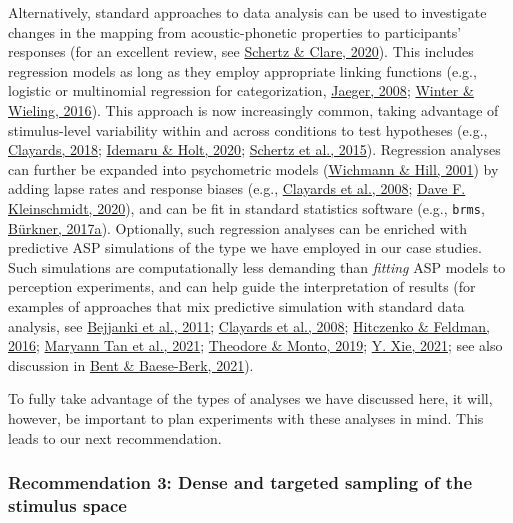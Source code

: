 \documentclass[
  11pt,
  english,
  man,floatsintext]{apa6}
\begin{document}
Alternatively, standard approaches to data analysis can be used to investigate changes in the mapping from acoustic-phonetic properties to participants' responses (for an excellent review, see \protect\hyperlink{ref-schertz-clare2020}{Schertz \& Clare, 2020}). This includes regression models as long as they employ appropriate linking functions (e.g., logistic or multinomial regression for categorization, \protect\hyperlink{ref-jaeger2008}{Jaeger, 2008}; \protect\hyperlink{ref-winter-wieling2016}{Winter \& Wieling, 2016}). This approach is now increasingly common, taking advantage of stimulus-level variability within and across conditions to test hypotheses (e.g., \protect\hyperlink{ref-clayards2018}{Clayards, 2018}; \protect\hyperlink{ref-idemaru-holt2020}{Idemaru \& Holt, 2020}; \protect\hyperlink{ref-schertz2015}{Schertz et al., 2015}). Regression analyses can further be expanded into psychometric models (\protect\hyperlink{ref-wichmann-hill2001}{Wichmann \& Hill, 2001}) by adding lapse rates and response biases (e.g., \protect\hyperlink{ref-clayards2008}{Clayards et al., 2008}; \protect\hyperlink{ref-kleinschmidt2020}{Dave F. Kleinschmidt, 2020}), and can be fit in standard statistics software (e.g., \texttt{brms}, \protect\hyperlink{ref-burkner2017}{Bürkner, 2017a}). Optionally, such regression analyses can be enriched with predictive ASP simulations of the type we have employed in our case studies. Such simulations are computationally less demanding than \emph{fitting} ASP models to perception experiments, and can help guide the interpretation of results (for examples of approaches that mix predictive simulation with standard data analysis, see \protect\hyperlink{ref-bejjanki2011}{Bejjanki et al., 2011}; \protect\hyperlink{ref-clayards2008}{Clayards et al., 2008}; \protect\hyperlink{ref-hitczenko-feldman2016}{Hitczenko \& Feldman, 2016}; \protect\hyperlink{ref-tan2021}{Maryann Tan et al., 2021}; \protect\hyperlink{ref-theodore-monto2019}{Theodore \& Monto, 2019}; \protect\hyperlink{ref-xie2021}{Y. Xie, 2021}; see also discussion in \protect\hyperlink{ref-bent-baeseberk2021}{Bent \& Baese-Berk, 2021}).

To fully take advantage of the types of analyses we have discussed here, it will, however, be important to plan experiments with these analyses in mind. This leads to our next recommendation.

\hypertarget{recommendation-3-dense-and-targeted-sampling-of-the-stimulus-space}{%
\subsubsection{Recommendation 3: Dense and targeted sampling of the stimulus space}\label{recommendation-3-dense-and-targeted-sampling-of-the-stimulus-space}}
\end{document}
